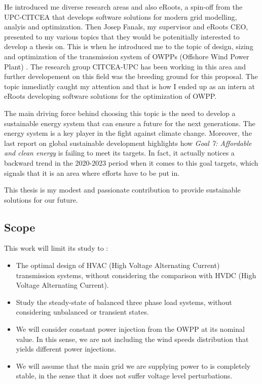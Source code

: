 \documentclass[a4paper,11pt, titlepage, twoside]{article}
\begin{document}
He introduced me diverse research areas and also eRoots, a spin-off from the UPC-CITCEA
that develops software solutions for modern grid modelling, analyis and optimization. Then Josep Fanals, my supervisor
and eRoots CEO, presented to my various topics that they would be potenitially interested to develop a thesis on. This is when 
he introduced me to the topic of design, sizing and optimization of the transmission system of OWPPs (Offshore Wind Power Plant) . The research 
group CITCEA-UPC has been working in this area \cite{paperbase} and further developement on this field was the breeding ground for this proposal.
The topic inmediatly caught my attention and that is how I ended up as an intern at eRoots developing software solutions for the optimization of OWPP.


The main driving force behind choosing this topic is the need to develop a sustainable energy system that can
ensure a future for the next generations. The energy system is a key player in the fight against climate change. Moreover, the last
report on global sustainable development \cite{SustGoal7} highlights how \textit{Goal 7: Affordable and clean energy} is failing to meet its targets.
In fact, it actually notices a backward trend in the 2020-2023 period when it comes to this goal targets, which signals that it is an area where efforts
have to be put in. \par

This thesis is my modest and passionate contribution to provide sustainable solutions for our future.

\subsection{Scope}

This work will limit its study to :
\begin{itemize}
    \item The optimal design of HVAC (High Voltage Alternating Current) transmission systems, without considering the comparison with HVDC (High Voltage Alternating Current).
    \item Study the steady-state of balanced three phase load systems, without considering unbalanced or transient states.
    \item We will consider constant power injection from the OWPP at its nominal value. In this sense, we are not including the wind speeds distribution that yields different 
    power injections.
    \item We will assume that the main grid we are supplying power to is completely stable, in the sense that it does not suffer voltage level perturbations.
\end{itemize}
\end{document}
